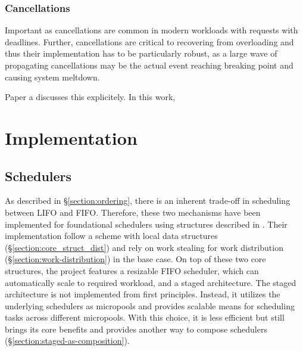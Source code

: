 \documentclass[12pt,a4paper,twoside]{report}
\begin{document}
\subsection{Cancellations}
Important as cancellations are common in modern workloads with requests with deadlines. Further, cancellations are critical to recovering from overloading and thus their implementation has to be particularly robust, as a large wave of propagating cancellations may be the actual event reaching breaking point and causing system meltdown.  

Paper a discusses this explicitely. In this work,



\chapter{Implementation}

\section{Schedulers}
\label{section:impl-schedulers}
As described in \S\ref{section:ordering}, there is an inherent trade-off in scheduling between LIFO and FIFO. Therefore, these two mechanisms have been implemented for foundational schedulers using structures described in . Their implementation follow a scheme with local data structures (\S\ref{section:core_struct_dist}) and rely on work stealing for work distribution (\S\ref{section:work-distribution}) in the base case. On top of these two core structures, the project features a resizable FIFO scheduler, which can automatically scale to required workload, and a staged architecture. The staged architecture is not implemented from first principles. Instead, it utilizes the underlying schedulers as micropools and provides scalable means for scheduling tasks across different micropools. With this choice, it is less efficient but still brings its core benefits and provides another way to compose schedulers (\S\ref{section:staged-as-composition}).
\end{document}
